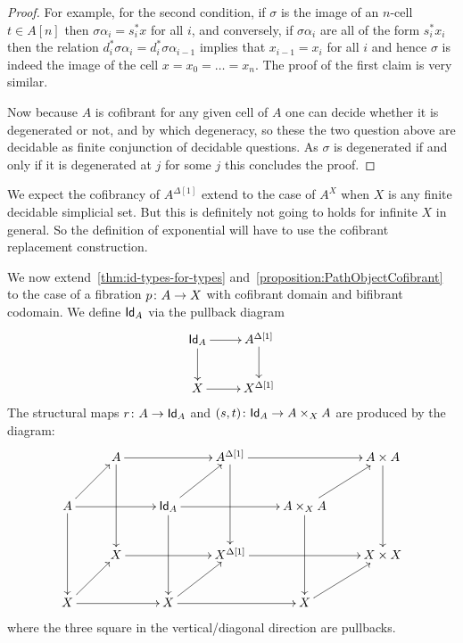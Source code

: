 \documentclass[reqno,10pt,a4paper,oneside,draft]{amsart}
\begin{document}
\begin{proof}
For example, for the second condition, if $\sigma$ is the image of an $n$-cell $t \in A[n]$ then $\sigma \alpha_i = s_i^* x$ for all $i$, and conversely, if $\sigma \alpha_i$ are all of the form $s_i^* x_i$ then the relation $d_i^* \sigma \alpha_i = d_{i}^* \sigma \alpha_{i-1}$ implies that $x_{i-1}=x_i$ for all $i$ and hence $\sigma$ is indeed the image of the cell $x=x_0= \dots = x_n$. The proof of the first claim is very similar.

Now because $A$ is cofibrant for any given cell of $A$ one can decide whether it is degenerated or not, and by which degeneracy, so these the two question above are decidable as finite conjunction of decidable questions. As $\sigma$ is degenerated if and only if it is degenerated at $j$ for some $j$ this concludes the proof.
\end{proof}


\begin{remark}
We expect the cofibrancy of $A^{\Delta[1]}$ extend to the case of $A^{X}$ when $X$ is any finite decidable simplicial set. But this is definitely not going to holds for infinite $X$ in general. So the definition of exponential will have to use the cofibrant replacement construction.
\end{remark} 


\bigskip


We now extend~\cref{thm:id-types-for-types} and~\cref{proposition:PathObjectCofibrant} 
to the case of a fibration $p \colon A \rightarrow X$ with cofibrant domain and bifibrant codomain. We define $\mathsf{Id}_A$ 
via the pullback diagram
\[
\xymatrix{
\Id_A \ar[r] \ar[d] & A^{\Delta[1]} \ar[d] \\
X \ar[r] & X^{\Delta[1]} \\
}
\]
The structural maps $r \colon A \rightarrow \mathsf{Id}_A$ and $(s, t) \colon \mathsf{Id}_A \rightarrow A \times_{X} A$ are produced by the diagram:
\[
\xymatrix{
& A \ar[rr] \ar[dd] & & A^{\Delta[1]} \ar[rr] \ar[dd] & & A \times A \ar[dd] \\
A \ar[ur] \ar[rr] \ar[dd] & & \Id_A \ar[ur] \ar[rr] \ar[dd] & & A \times_{X} A \ar[ur] \ar[dd] \\
& X \ar[rr] & & X^{\Delta[1]} \ar[rr] & & X \times X \\
X \ar[ur] \ar[rr] & & X \ar[rr] \ar[ur] & & X \ar[ur] \\ 
}
\]
where the three square in the vertical/diagonal direction are pullbacks.
\end{document}
